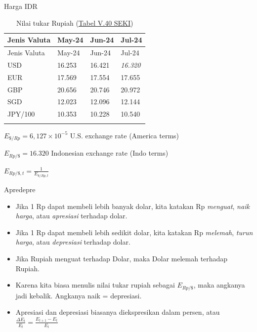 \documentclass[
  ignorenonframetext,
]{beamer}
\begin{document}
\begin{frame}{Harga IDR}
\label{harga-idr}
\begin{longtable}[]{@{}llll@{}}
\caption{Nilai tukar Rupiah
(\href{https://www.bi.go.id/id/statistik/ekonomi-keuangan/seki/Default.aspx\#headingFour}{Tabel
V.40 SEKI})}\tabularnewline
\toprule\noalign{}
Jenis Valuta & May-24 & Jun-24 & Jul-24 \\
\midrule\noalign{}
\endfirsthead
\toprule\noalign{}
Jenis Valuta & May-24 & Jun-24 & Jul-24 \\
\midrule\noalign{}
\endhead
USD & 16.253 & 16.421 & \emph{16.320} \\
EUR & 17.569 & 17.554 & 17.655 \\
GBP & 20.656 & 20.746 & 20.972 \\
SGD & 12.023 & 12.096 & 12.144 \\
JPY/100 & 10.353 & 10.228 & 10.540 \\
\bottomrule\noalign{}
\end{longtable}

\(E_{\$/Rp}=6,127\times 10^{-5}\) U.S. exchange rate (America terms)

\(E_{Rp/\$}=16.320\) Indonesian exchange rate (Indo terms)

\(E_{Rp/\$,t}=\frac{1}{E_{\$/Rp,t}}\)
\end{frame}

\begin{frame}{Apredepre}
\label{apredepre}
\begin{itemize}
\item
  Jika 1 Rp dapat membeli lebih banyak dolar, kita katakan Rp
  \emph{menguat}, \emph{naik harga}, atau \emph{apresiasi} terhadap
  dolar.
\item
  Jika 1 Rp dapat membeli lebih sedikit dolar, kita katakan Rp
  \emph{melemah}, \emph{turun harga}, atau \emph{depresiasi} terhadap
  dolar.
\item
  Jika Rupiah menguat terhadap Dolar, maka Dolar melemah terhadap
  Rupiah.
\item
  Karena kita biasa menulis nilai tukar rupiah sebagai \(E_{Rp/\$}\),
  maka angkanya jadi kebalik. Angkanya naik = depresiasi.
\item
  Apresiasi dan depresiasi biasanya diekspresikan dalam persen, atau
  \(\frac{\Delta E_{t}}{E_t}=\frac{E_{t+1}-E_{t}}{E_{t}}\)
\end{itemize}
\end{frame}
\end{document}
